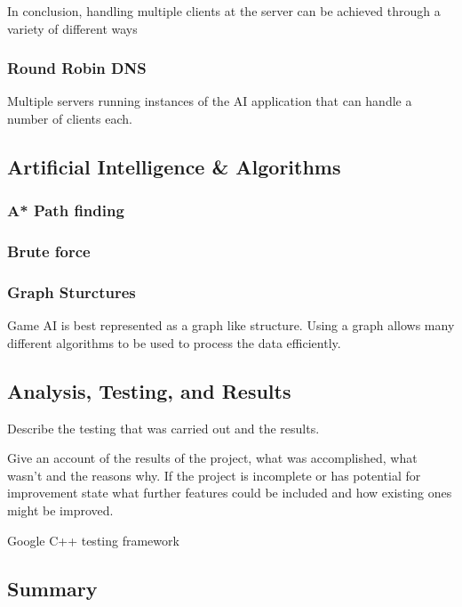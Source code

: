 \documentclass[12pt,a4paper,titlepage]{article}
\begin{document}
In conclusion, handling multiple clients at the server can be achieved through a variety of different ways 

\subsubsection{Round Robin DNS}

Multiple servers running instances of the AI application that can handle a number of clients each. 

\subsection{Artificial Intelligence \& Algorithms}
\label{section:aimoduledesign}

\subsubsection{A* Path finding}

\subsubsection{Brute force}

\subsubsection{Graph Sturctures}

Game AI is best represented as a graph like structure. Using a graph allows many different algorithms to be used to process the data efficiently.

\subsection{Analysis, Testing, and Results}

Describe the testing that was carried out and the results.

Give an account of the results of the project, what was accomplished, what wasn't and the reasons why. If the project is incomplete or has potential for improvement state what further features could be included and how existing ones might be improved.

Google C++ testing framework

\subsection{Summary}
\end{document}
